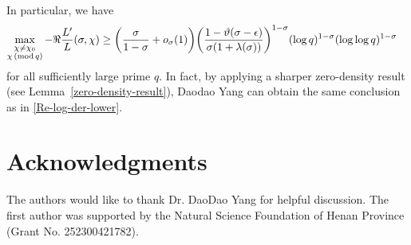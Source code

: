 \documentclass[12pt]{amsart}
\numberwithin{equation}{section}
\theoremstyle{plain}
\theoremstyle{remark}
\theoremstyle{definition}
\theoremstyle{remark}
\renewcommand{\mod}[1]{\,({\rm mod}\,#1)}
\begin{document}
In particular, we have
\begin{equation}\label{Re-log-der-lower}
\begin{aligned}
\max_{\substack{\chi\neq\chi_0\\ \chi\mod q}}-\Re\frac{L'}{L}(\sigma,\chi)
&\geq\bigg(\frac{\sigma}{1-\sigma}+o_{\sigma}(1)\bigg)
\bigg(\frac{1-\vartheta(\sigma-\epsilon)}{\sigma(1+\lambda(\sigma))}\bigg)^{1-\sigma}(\log q)^{1-\sigma}(\log\log q)^{1-\sigma}
\end{aligned}
\end{equation}
for all sufficiently large prime $q$. In fact, by applying a sharper zero-density result (see Lemma~\ref{zero-density-result}), Daodao Yang \cite{Yangdaodao2023} can obtain the same conclusion as in \eqref{Re-log-der-lower}.

\section*{Acknowledgments}
The authors would like to thank Dr. DaoDao Yang for helpful discussion. The first author was supported by the Natural Science Foundation of Henan Province (Grant No. 252300421782).
\end{document}
